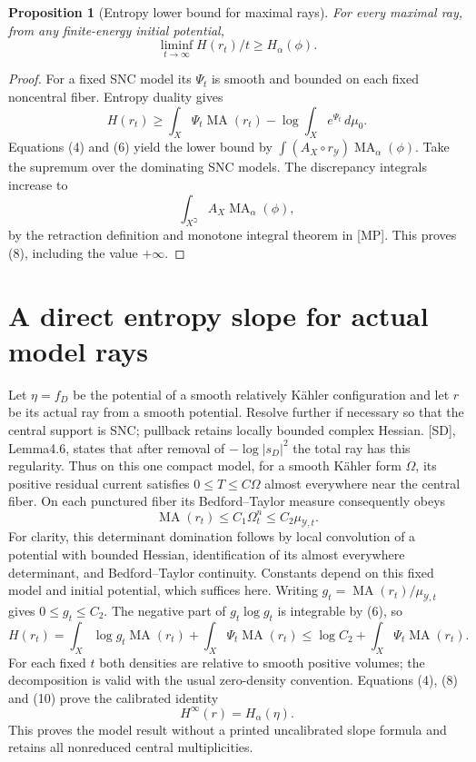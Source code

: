\documentclass[11pt]{article}
\newcommand{\MA}{\operatorname{MA}}
\newtheorem{proposition}[theorem]{Proposition}
\begin{document}
\begin{proposition}[Entropy lower bound for maximal rays]
For every maximal ray, from any finite-energy initial potential,
\[
 \liminf_{t\to\infty}H(r_t)/t\geq H_\alpha(\phi).          \tag{8}
\]
\end{proposition}
\begin{proof}
For a fixed SNC model its $\Psi_t$ is smooth and bounded on each
fixed noncentral fiber. Entropy duality gives
\[
 H(r_t)\geq\int_X\Psi_t\MA(r_t)
                  -\log\int_Xe^{\Psi_t}\,d\mu_0.
\]
Equations (4) and (6) yield the lower bound by
$\int(A_X\circ r_{\mathcal Y})\MA_\alpha(\phi)$.
Take the supremum over the dominating SNC models. The discrepancy
integrals increase to
\[
 \int_{X^\beth}A_X\MA_\alpha(\phi),
\]
by the retraction definition and monotone integral theorem
in [MP]. This proves (8), including the value $+\infty$.
\end{proof}

\section{A direct entropy slope for actual model rays}
Let $\eta=f_D$ be the potential of a smooth relatively K\"ahler
configuration and let $r$ be its actual ray from a smooth potential.
Resolve further if necessary so that the central support is SNC;
pullback retains locally bounded complex Hessian. [SD], Lemma4.6,
states that after removal of $-\log|s_D|^2$ the total ray has this
regularity. Thus on this one compact model, for a smooth K\"ahler
form $\Omega$, its positive residual current satisfies
$0\leq T\leq C\Omega$ almost everywhere near the central fiber.
On each punctured fiber its Bedford--Taylor measure consequently obeys
\[
 \MA(r_t)\leq C_1\Omega_t^n\leq C_2\mu_{\mathcal Y,t}.     \tag{9}
\]
For clarity, this determinant domination follows by local convolution
of a potential with bounded Hessian, identification of its almost
everywhere determinant, and Bedford--Taylor continuity. Constants
depend on this fixed model and initial potential, which suffices here.
Writing $g_t=\MA(r_t)/\mu_{\mathcal Y,t}$ gives $0\leq g_t\leq C_2$.
The negative part of $g_t\log g_t$ is integrable by (6), so
\[
 H(r_t)=\int_X\log g_t\MA(r_t)+\int_X\Psi_t\MA(r_t)
       \leq\log C_2+\int_X\Psi_t\MA(r_t).                 \tag{10}
\]
For each fixed $t$ both densities are relative to smooth positive
volumes; the decomposition is valid with the usual zero-density
convention. Equations (4), (8) and (10) prove the calibrated identity
\[
 H^\infty(r)=H_\alpha(\eta).                               \tag{11}
\]
This proves the model result without a printed uncalibrated slope
formula and retains all nonreduced central multiplicities.
\end{document}
